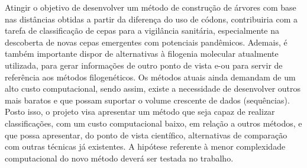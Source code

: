 Atingir o objetivo de desenvolver um método de construção de árvores com base nas distâncias obtidas a partir da diferença do uso de códons, contribuiria com a tarefa de classificação de cepas para a vigilância sanitária, especialmente na descoberta de novas cepas emergentes com potenciais pandêmicos. Ademais, é também importante dispor de alternativas à filogenia molecular atualmente utilizada, para gerar informações de outro ponto de vista e-ou para servir de referência aos métodos filogenéticos.
Os métodos atuais ainda demandam de um alto custo computacional, sendo assim, existe a necessidade de desenvolver outros mais baratos e que possam suportar o volume crescente de dados (sequências).
Posto isso, o projeto visa apresentar um método que seja capaz de realizar classificações, com um custo computacional baixo, em relação a outros métodos, e que possa apresentar, do ponto de vista científico, alternativas de comparação com outras técnicas já existentes. A hipótese referente à menor complexidade computacional do novo método deverá ser testada no trabalho.








